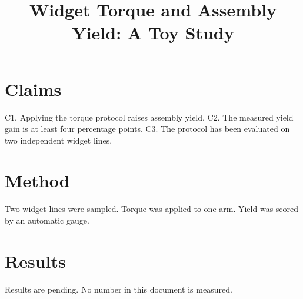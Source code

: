 \title{Widget Torque and Assembly Yield: A Toy Study}

\section{Claims}
C1. Applying the torque protocol raises assembly yield.
C2. The measured yield gain is at least four percentage points.
C3. The protocol has been evaluated on two independent widget lines.

\section{Method}
Two widget lines were sampled. Torque was applied to one arm.
Yield was scored by an automatic gauge.

\section{Results}
Results are pending. No number in this document is measured.
